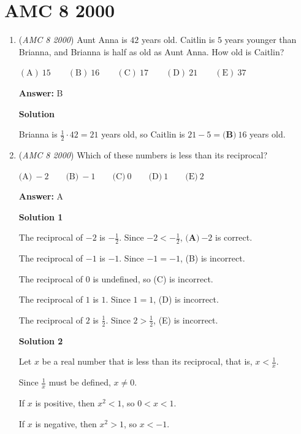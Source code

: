 \section{AMC 8 2000}
        \begin{enumerate}
        	\item (\textit{AMC 8 2000}) Aunt Anna is $42$ years old. Caitlin is $5$ years younger than Brianna, and Brianna is half as old as Aunt Anna. How old is Caitlin?


 $\mathrm{(A)}\ 15\qquad\mathrm{(B)}\ 16\qquad\mathrm{(C)}\ 17\qquad\mathrm{(D)}\ 21\qquad\mathrm{(E)}\ 37$

 \textbf{Answer: }B



\textbf{Solution}

Brianna is $\frac{1}{2} \cdot 42 = 21$ years old, so Caitlin is $21-5=\boxed{\textbf{(B)}\ 16}$ years old.

 


	\item (\textit{AMC 8 2000}) Which of these numbers is less than its reciprocal?


 $\text{(A)}\ -2 \qquad \text{(B)}\ -1 \qquad \text{(C)}\ 0 \qquad \text{(D)}\ 1 \qquad \text{(E)}\ 2$

 \textbf{Answer: }A



\textbf{Solution 1}

The reciprocal of $-2$ is $-\frac{1}{2}$.  Since $-2 < -\frac{1}{2}$, $\boxed{\textbf{(A)}\ {-2}}$ is correct.

 The reciprocal of $-1$ is $-1$.  Since $-1 = -1$, (B) is incorrect.

 The reciprocal of $0$ is undefined, so (C) is incorrect.

 The reciprocal of $1$ is $1$.  Since $1 = 1$, (D) is incorrect.

 The reciprocal of $2$ is $\frac{1}{2}$.  Since $2 > \frac{1}{2}$, (E) is incorrect.

 



\textbf{Solution 2}

Let $x$ be a real number that is less than its reciprocal, that is, $x < \frac{1}{x}$.

 Since $\frac{1}{x}$ must be defined, $x \neq 0$.

 If $x$ is positive, then $x^2 < 1$, so $0 < x < 1$.

 If $x$ is negative, then $x^2 > 1$, so $x < -1$.


\end{enumerate}
